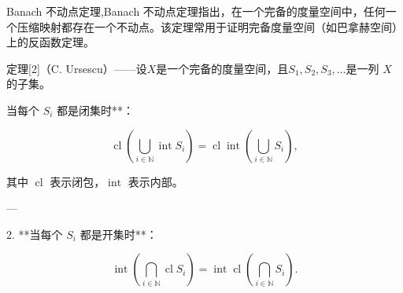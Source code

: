 Banach 不动点定理,Banach 不动点定理指出，在一个完备的度量空间中，任何一个压缩映射都存在一个不动点。该定理常用于证明完备度量空间（如巴拿赫空间）上的反函数定理。

定理[2]（C. Ursescu）——设$X$是一个完备的度量空间，且$S_1, S_2, S_3, \ldots$是一列 $X$ 的子集。



当每个 $S_i$ 都是闭集时**：

   $$
   \operatorname{cl} \left(\bigcup_{i\in\mathbb{N}} \operatorname{int} S_i\right) 
   = 
   \operatorname{cl} \operatorname{int} \left(\bigcup_{i\in\mathbb{N}} S_i\right),
   $$

   其中 $\operatorname{cl}$ 表示闭包，$\operatorname{int}$ 表示内部。

---

2. **当每个 $S_i$ 都是开集时**：

   $$
   \operatorname{int} \left(\bigcap_{i\in\mathbb{N}} \operatorname{cl} S_i\right)
   =
   \operatorname{int} \operatorname{cl} \left(\bigcap_{i\in\mathbb{N}} S_i\right).
   $$

